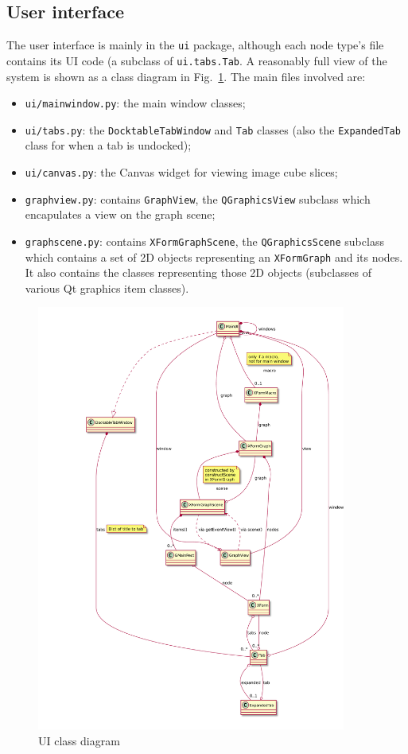 \subsection{User interface}
The user interface is mainly in the \texttt{ui} package, although each
node type's file contains its UI code (a subclass of \texttt{ui.tabs.Tab}.
A reasonably full view of the system is shown as a class diagram
in Fig.~\ref{ui.pdf}.
The main files involved are:
\begin{itemize}
\item \texttt{ui/mainwindow.py}: the main window classes;
\item \texttt{ui/tabs.py}: the \texttt{DocktableTabWindow} and \texttt{Tab}
classes (also the \texttt{ExpandedTab} class for when a tab is undocked);
\item \texttt{ui/canvas.py}: the Canvas widget for viewing image cube slices;
\item \texttt{graphview.py}: contains \texttt{GraphView}, the
\texttt{QGraphicsView} subclass which encapulates a view on the graph scene;
\item \texttt{graphscene.py}: contains \texttt{XFormGraphScene},
the \texttt{QGraphicsScene} subclass which contains a set of 2D objects
representing an \texttt{XFormGraph} and its nodes. It also contains the
classes representing those 2D objects (subclasses of various Qt graphics item
classes).
\end{itemize}

\begin{figure}[ht]
\center
\includegraphics[width=4in]{ui.pdf}
\caption{UI class diagram}
\label{ui.pdf}
\end{figure}


